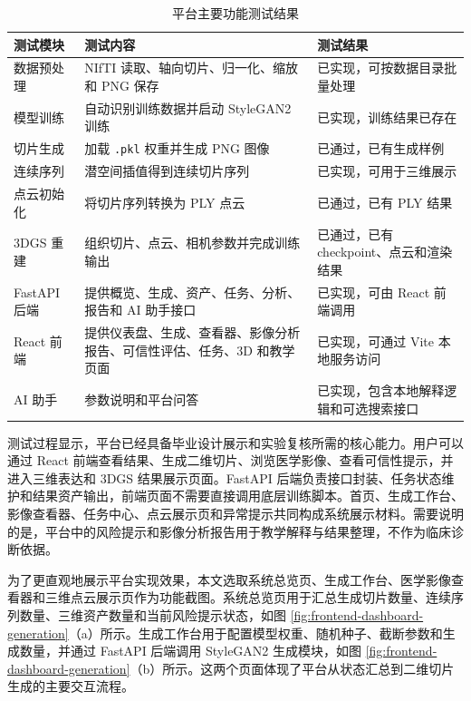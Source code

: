 \begin{table}[H]
\centering
\caption{平台主要功能测试结果}
\begin{tabular}{>{\raggedright\arraybackslash}p{3cm}>{\raggedright\arraybackslash}p{5.2cm}>{\raggedright\arraybackslash}p{4.8cm}}
\toprule
测试模块 & 测试内容 & 测试结果 \\
\midrule
数据预处理 & NIfTI 读取、轴向切片、归一化、缩放和 PNG 保存 & 已实现，可按数据目录批量处理 \\
模型训练 & 自动识别训练数据并启动 StyleGAN2 训练 & 已实现，训练结果已存在 \\
切片生成 & 加载 \texttt{.pkl} 权重并生成 PNG 图像 & 已通过，已有生成样例 \\
连续序列 & 潜空间插值得到连续切片序列 & 已实现，可用于三维展示 \\
点云初始化 & 将切片序列转换为 PLY 点云 & 已通过，已有 PLY 结果 \\
3DGS 重建 & 组织切片、点云、相机参数并完成训练输出 & 已通过，已有 checkpoint、点云和渲染结果 \\
FastAPI 后端 & 提供概览、生成、资产、任务、分析、报告和 AI 助手接口 & 已实现，可由 React 前端调用 \\
React 前端 & 提供仪表盘、生成、查看器、影像分析报告、可信性评估、任务、3D 和教学页面 & 已实现，可通过 Vite 本地服务访问 \\
AI 助手 & 参数说明和平台问答 & 已实现，包含本地解释逻辑和可选搜索接口 \\
\bottomrule
\end{tabular}
\end{table}

测试过程显示，平台已经具备毕业设计展示和实验复核所需的核心能力。用户可以通过 React 前端查看结果、生成二维切片、浏览医学影像、查看可信性提示，并进入三维表达和 3DGS 结果展示页面。FastAPI 后端负责接口封装、任务状态维护和结果资产输出，前端页面不需要直接调用底层训练脚本。首页、生成工作台、影像查看器、任务中心、点云展示页和异常提示共同构成系统展示材料。需要说明的是，平台中的风险提示和影像分析报告用于教学解释与结果整理，不作为临床诊断依据。

为了更直观地展示平台实现效果，本文选取系统总览页、生成工作台、医学影像查看器和三维点云展示页作为功能截图。系统总览页用于汇总生成切片数量、连续序列数量、三维资产数量和当前风险提示状态，如图 \ref{fig:frontend-dashboard-generation}（a）所示。生成工作台用于配置模型权重、随机种子、截断参数和生成数量，并通过 FastAPI 后端调用 StyleGAN2 生成模块，如图 \ref{fig:frontend-dashboard-generation}（b）所示。这两个页面体现了平台从状态汇总到二维切片生成的主要交互流程。

